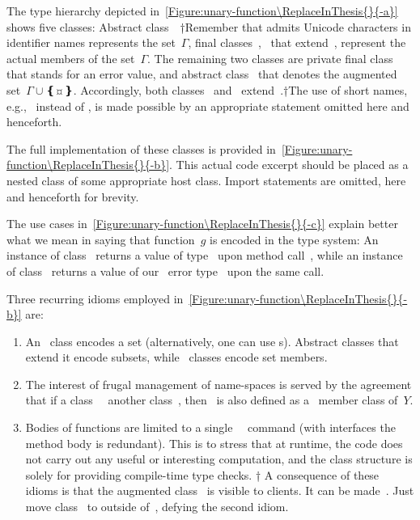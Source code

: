 The type hierarchy depicted in~\cref{Figure:unary-function\ReplaceInThesis{}{-a}} shows five classes:
Abstract class~~†{Remember that \Java admits Unicode characters in identifier names} represents the set~$Γ$, final classes~,~
  that extend~, represent the actual members of the set~$Γ$.
The remaining two classes are private final class~ that stands for an error value,
  and abstract class~ that denotes the augmented set~$Γ∪❴\text{¤}❵$.
Accordingly, both classes~ and~ extend~.†{The use
  of short names, e.g.,~ instead of ,
    is made possible by an appropriate  statement omitted here and henceforth.}

    The full implementation of these classes is provided in~\cref{Figure:unary-function\ReplaceInThesis{}{-b}}.
This actual code excerpt should be placed as a nested class of some appropriate host class. Import statements are omitted, here and henceforth for brevity.

The use cases in~\cref{Figure:unary-function\ReplaceInThesis{}{-c}} explain better
  what we mean in saying that function~$g$ is encoded in the type system:
  An instance of class~ returns a value of type~ upon
  method call~, while
  an instance of class~ returns a value of our~
  error type~ upon the same call.

Three recurring idioms employed in~\cref{Figure:unary-function\ReplaceInThesis{}{-b}} are:
\begin{enumerate}
  \item An~ class encodes a set (alternatively, one can use s).
    Abstract classes that extend it encode
      subsets, while~ classes encode set members.
  \item The interest of frugal management of name-spaces is served
    by the agreement that if a class~~ another class~, then~ is also defined
    as a~ member class of~$Y$.
  \item Bodies of functions are limited to a single~~\cc{;} command
      (with interfaces the method body is redundant).
      This is to stress that at runtime, the code does not carry out any useful or interesting computation,
      and the class structure is solely for providing compile-time type checks.
†{%
A consequence of these idioms is that the augmented class~ is visible to clients.
It can be made~. Just move class~ to outside of~, defying the second idiom.
}
\end{enumerate}

